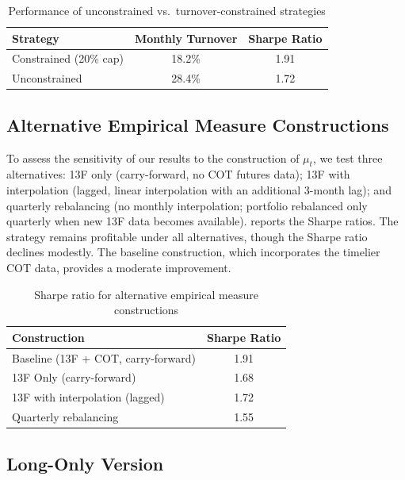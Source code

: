 \begin{table}[ht]
\centering
\caption{Performance of unconstrained vs.\ turnover-constrained strategies}
\label{tab:robustness-turnover}
\begin{tabular}{lcc}
\toprule
\textbf{Strategy} & \textbf{Monthly Turnover} & \textbf{Sharpe Ratio} \\
\midrule
Constrained (20\% cap) & 18.2\% & 1.91 \\
Unconstrained & 28.4\% & 1.72 \\
\bottomrule
\end{tabular}
\end{table}

\subsection{Alternative Empirical Measure Constructions}

To assess the sensitivity of our results to the construction of $\mu_t$, we test
three alternatives: 13F only (carry-forward, no COT futures data); 13F with
interpolation (lagged, linear interpolation with an additional 3-month lag);
and quarterly rebalancing (no monthly interpolation; portfolio rebalanced only
quarterly when new 13F data becomes available). 
reports the Sharpe ratios. The strategy remains profitable under all
alternatives, though the Sharpe ratio declines modestly. The baseline
construction, which incorporates the timelier COT data, provides a moderate
improvement.

\begin{table}[ht]
\centering
\caption{Sharpe ratio for alternative empirical measure constructions}
\label{tab:robustness-measure}
\begin{tabular}{lc}
\toprule
\textbf{Construction} & \textbf{Sharpe Ratio} \\
\midrule
Baseline (13F + COT, carry-forward) & 1.91 \\
13F Only (carry-forward) & 1.68 \\
13F with interpolation (lagged) & 1.72 \\
Quarterly rebalancing & 1.55 \\
\bottomrule
\end{tabular}
\end{table}

\subsection{Long-Only Version}

